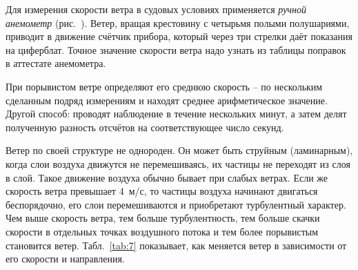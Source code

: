 Для измерения скорости ветра в судовых условиях применяется
\textit{ручной анемометр} (рис.~). Ветер,
вращая крестовину с четырьмя полыми полушариями, приводит в движение
счётчик прибора, который через три стрелки даёт показания на
циферблат. Точное значение скорости ветра надо узнать из таблицы
поправок в аттестате анемометра.

При порывистом ветре определяют его среднюю скорость \--- по
нескольким сделанным подряд измерениям и находят среднее
арифметическое значение. Другой способ: проводят наблюдение в течение
нескольких минут, а затем делят полученную разность отсчётов на
соответствующее число секунд.

Ветер по своей структуре не однороден. Он может быть струйным
(ламинарным), когда слои воздуха движутся не перемешиваясь, их частицы
не переходят из слоя в слой. Такое движение воздуха обычно бывает при
слабых ветрах. Если же скорость ветра превышает 4~м/с, то частицы
воздуха начинают двигаться беспорядочно, его слои перемешиваются и
приобретают турбулентный характер. Чем выше скорость ветра, тем больше
турбулентность, тем больше скачки скорости в отдельных точках
воздушного потока и тем более порывистым становится
ветер. Табл.~\ref{tab:7} показывает, как меняется ветер в зависимости
от его скорости и направления.

